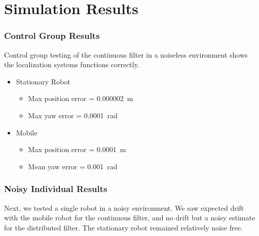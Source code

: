 \documentclass[14pt]{beamer}
\begin{document}
\section{Simulation Results}
\begin{frame}
\frametitle{Control Group Results}
Control group testing of the continuous filter in a noiseless environment shows the localization systems functions correctly.

\begin{itemize}
\pause
\item Stationary Robot
    \begin{itemize}
    \item Max position error = \SI{.000002}{\meter}
    \item Max yaw error = \SI{.0001}{\radian}
    \end{itemize}
\pause
\item Mobile
    \begin{itemize}
    \item Max position error = \SI{.0001}{\meter}
    \item Mean yaw error = \SI{.001}{\radian}
    \end{itemize}
\end{itemize}
\end{frame}

\begin{frame}
\frametitle{Noisy Individual Results}
Next, we tested a single robot in a noisy environment. We saw expected drift with the mobile robot for the continuous filter, and no drift but a noisy estimate for the distributed filter. The stationary robot remained relatively noise free.
\end{frame}
\end{document}
